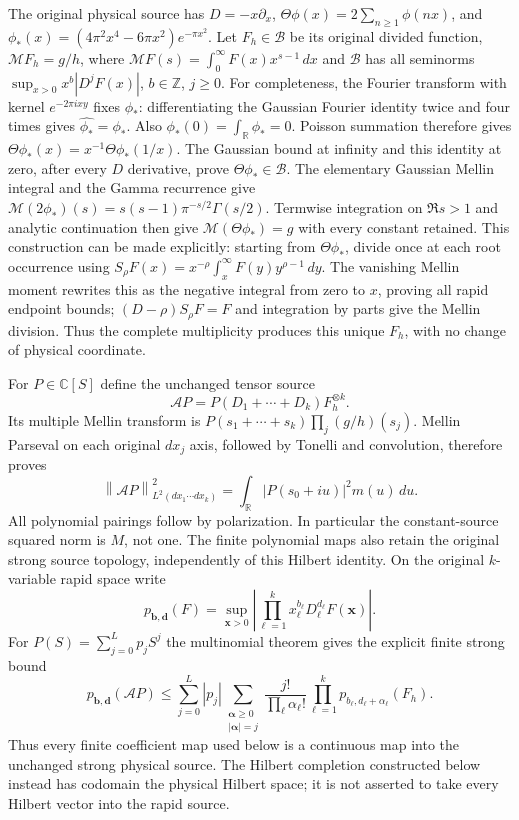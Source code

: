 \documentclass[11pt]{article}
\newcommand{\C}{\mathbb C}\newcommand{\R}{\mathbb R}
\newcommand{\B}{\mathscr B}\newcommand{\M}{\mathcal M}
\newcommand{\norm}[1]{\left\lVert#1\right\rVert}
\begin{document}
The original physical source has $D=-x\partial_x$,
$\Theta\phi(x)=2\sum_{n\geq1}\phi(nx)$, and
$\phi_*(x)=(4\pi^2x^4-6\pi x^2)e^{-\pi x^2}$.
Let $F_h\in\B$ be its original divided function,
$\M F_h=g/h$, where $\M F(s)=\int_0^\infty F(x)x^{s-1}\,dx$
and $\B$ has all seminorms
$\sup_{x>0}x^b|D^jF(x)|$, $b\in\mathbb Z$, $j\geq0$.
For completeness, the Fourier transform with kernel
$e^{-2\pi ixy}$ fixes $\phi_*$: differentiating the Gaussian
Fourier identity twice and four times gives
$\widehat{\phi_*}=\phi_*$. Also $\phi_*(0)=\int_\R\phi_*=0$.
Poisson summation therefore gives
$\Theta\phi_*(x)=x^{-1}\Theta\phi_*(1/x)$.
The Gaussian bound at infinity and this identity at zero,
after every $D$ derivative, prove $\Theta\phi_*\in\B$.
The elementary Gaussian Mellin integral and the Gamma
recurrence give
$\M(2\phi_*)(s)=s(s-1)\pi^{-s/2}\Gamma(s/2)$.
Termwise integration on $\Re s>1$ and analytic continuation
then give $\M(\Theta\phi_*)=g$ with every constant retained.
This construction can be made explicitly: starting from
$\Theta\phi_*$, divide once at each root occurrence using
$S_\rho F(x)=x^{-\rho}\int_x^\infty F(y)y^{\rho-1}\,dy$.
The vanishing Mellin moment rewrites this as the negative
integral from zero to $x$, proving all rapid endpoint bounds;
$(D-\rho)S_\rho F=F$ and integration by parts give the Mellin
division. Thus the complete multiplicity produces this
unique $F_h$, with no change of physical coordinate.

For $P\in\C[S]$ define the unchanged tensor source
\begin{equation}\label{eq:physical}
 \mathcal A P=P(D_1+\cdots+D_k)F_h^{\otimes k}.
\end{equation}
Its multiple Mellin transform is
$P(s_1+\cdots+s_k)\prod_j(g/h)(s_j)$.
Mellin Parseval on each original $dx_j$ axis, followed by
Tonelli and convolution, therefore proves
\begin{equation}\label{eq:isometry}
 \norm{\mathcal A P}_{L^2(dx_1\cdots dx_k)}^2
  =\int_\R|P(s_0+iu)|^2m(u)\,du.
\end{equation}
All polynomial pairings follow by polarization.
In particular the constant-source squared norm is $M$, not one.
The finite polynomial maps also retain the original strong
source topology, independently of this Hilbert identity.
On the original $k$-variable rapid space write
\[
 p_{\boldsymbol b,\boldsymbol d}(F)
 =\sup_{\boldsymbol x>0}
       \left|\prod_{\ell=1}^k x_\ell^{b_\ell}
                    D_\ell^{d_\ell}F(\boldsymbol x)\right|.
\]
For $P(S)=\sum_{j=0}^L p_jS^j$ the multinomial theorem gives
the explicit finite strong bound
\begin{equation}\label{eq:strongfinite}
 p_{\boldsymbol b,\boldsymbol d}(\mathcal A P)
 \leq\sum_{j=0}^L|p_j|
       \sum_{\substack{\boldsymbol\alpha\geq0\\|\boldsymbol\alpha|=j}}
       \frac{j!}{\prod_\ell\alpha_\ell!}
       \prod_{\ell=1}^k
                  p_{b_\ell,d_\ell+\alpha_\ell}(F_h).
\end{equation}
Thus every finite coefficient map used below is a continuous
map into the unchanged strong physical source.
The Hilbert completion constructed below instead has
codomain the physical Hilbert space; it is not asserted
to take every Hilbert vector into the rapid source.
\end{document}
